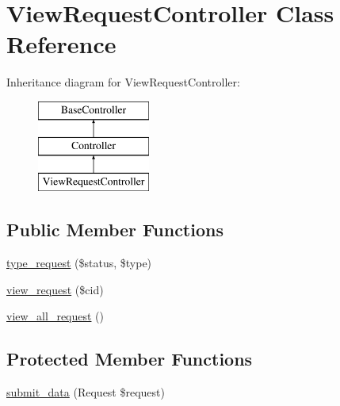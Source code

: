 \hypertarget{class_responsive_1_1_http_1_1_controllers_1_1_view_request_controller}{}\section{View\+Request\+Controller Class Reference}
\label{class_responsive_1_1_http_1_1_controllers_1_1_view_request_controller}
Inheritance diagram for View\+Request\+Controller\+:\begin{figure}[H]
\begin{center}
\leavevmode
\includegraphics[height=3.000000cm]{class_responsive_1_1_http_1_1_controllers_1_1_view_request_controller}
\end{center}
\end{figure}
\subsection*{Public Member Functions}
\begin{DoxyCompactItemize}
\item 
\mbox{\hyperlink{class_responsive_1_1_http_1_1_controllers_1_1_view_request_controller_a4af631b8ccdfdad440eb388ddc481d5d}{type\+\_\+request}} (\$status, \$type)
\item 
\mbox{\hyperlink{class_responsive_1_1_http_1_1_controllers_1_1_view_request_controller_abfa75d62e37dbdf13698da2a79b859e0}{view\+\_\+request}} (\$cid)
\item 
\mbox{\hyperlink{class_responsive_1_1_http_1_1_controllers_1_1_view_request_controller_af4b31f030fbbe74634114e820c3a13a0}{view\+\_\+all\+\_\+request}} ()
\end{DoxyCompactItemize}
\subsection*{Protected Member Functions}
\begin{DoxyCompactItemize}
\item 
\mbox{\hyperlink{class_responsive_1_1_http_1_1_controllers_1_1_view_request_controller_a0112dc42f1d9ee6284954433b1ae26a8}{submit\+\_\+data}} (Request \$request)
\end{DoxyCompactItemize}



